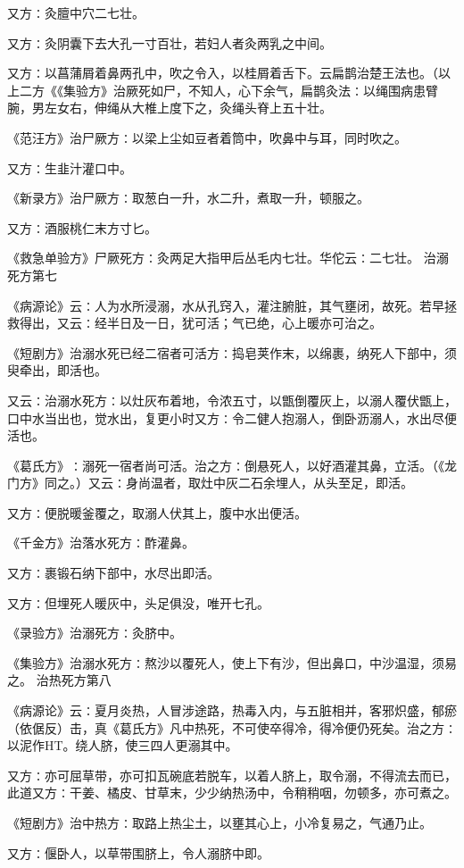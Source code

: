 \documentclass[a4paper,12pt,UTF8,twoside]{ctexbook}
\begin{document}
又方∶灸膻中穴二七壮。

又方∶灸阴囊下去大孔一寸百壮，若妇人者灸两乳之中间。

又方∶以菖蒲屑着鼻两孔中，吹之令入，以桂屑着舌下。云扁鹊治楚王法也。（以上二方《《集验方》治厥死如尸，不知人，心下余气，扁鹊灸法∶以绳围病患臂腕，男左女右，伸绳从大椎上度下之，灸绳头脊上五十壮。

《范汪方》治尸厥方∶以梁上尘如豆者着筒中，吹鼻中与耳，同时吹之。

又方∶生韭汁灌口中。

《新录方》治尸厥方∶取葱白一升，水二升，煮取一升，顿服之。

又方∶酒服桃仁末方寸匕。

《救急单验方》尸厥死方∶灸两足大指甲后丛毛内七壮。华佗云∶二七壮。
治溺死方第七

《病源论》云∶人为水所浸溺，水从孔窍入，灌注腑脏，其气壅闭，故死。若早拯救得出，又云∶经半日及一日，犹可活；气已绝，心上暖亦可治之。

《短剧方》治溺水死已经二宿者可活方∶捣皂荚作末，以绵裹，纳死人下部中，须臾牵出，即活也。

又云∶治溺水死方∶以灶灰布着地，令浓五寸，以甑倒覆灰上，以溺人覆伏甑上，口中水当出也，觉水出，复更小时又方∶令二健人抱溺人，倒卧沥溺人，水出尽便活也。

《葛氏方》∶溺死一宿者尚可活。治之方∶倒悬死人，以好酒灌其鼻，立活。（《龙门方》同之。）又云∶身尚温者，取灶中灰二石余埋人，从头至足，即活。

又方∶便脱暖釜覆之，取溺人伏其上，腹中水出便活。

《千金方》治落水死方∶酢灌鼻。

又方∶裹锻石纳下部中，水尽出即活。

又方∶但埋死人暖灰中，头足俱没，唯开七孔。

《录验方》治溺死方∶灸脐中。

《集验方》治溺水死方∶熬沙以覆死人，使上下有沙，但出鼻口，中沙温湿，须易之。
治热死方第八

《病源论》云∶夏月炎热，人冒涉途路，热毒入内，与五脏相并，客邪炽盛，郁瘀（依倨反）击，真《葛氏方》凡中热死，不可使卒得冷，得冷便仍死矣。治之方∶以泥作HT。绕人脐，使三四人更溺其中。

又方∶亦可屈草带，亦可扣瓦碗底若脱车，以着人脐上，取令溺，不得流去而已，此道又方∶干姜、橘皮、甘草末，少少纳热汤中，令稍稍咽，勿顿多，亦可煮之。

《短剧方》治中热方∶取路上热尘土，以壅其心上，小冷复易之，气通乃止。

又方∶偃卧人，以草带围脐上，令人溺脐中即。
\end{document}
